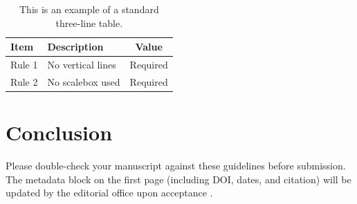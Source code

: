 \documentclass{scpe}
\begin{document}
\begin{table}[htbp]
    \centering
    \caption{This is an example of a standard three-line table.}
    \begin{tabular}{llc}
        \toprule
        \textbf{Item} & \textbf{Description} & \textbf{Value} \\
        \midrule
        Rule 1 & No vertical lines & Required \\
        Rule 2 & No scalebox used & Required \\
        \bottomrule
    \end{tabular}
\end{table}

\section{Conclusion}
Please double-check your manuscript against these guidelines before submission. The metadata block on the first page (including DOI, dates, and citation) will be updated by the editorial office upon acceptance \cite{ref-report, ref-website}. 



\end{document}
